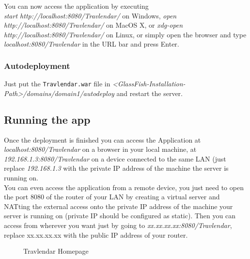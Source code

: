 You can now access the application by executing \\
\textit{start http://localhost:8080/Travlendar/} on Windows, \textit{open http://localhost:8080/Travlendar/} on MacOS X, or \textit{xdg-open http://localhost:8080/Travlendar/} on Linux, or simply open the browser and type \textit{localhost:8080/Travlendar} in the URL bar and press Enter.

\subsubsection{Autodeployment}
Just put the \texttt{Travlendar.war} file in \textit{<GlassFish-Installation-Path>/domains/domain1/autodeploy} and restart the server.

\subsection{Running the app}
Once the deployment is finished you can access the Application at \textit{localhost:8080/Travlendar}
on a browser in your local machine, at \textit{192.168.1.3:8080/Travlendar} on a device connected to the same LAN (just replace \textit{192.168.1.3} with the private IP address of the machine the server is running on. 
\\You can even access the application from a remote device, you just need to open the port 8080 of the router of your LAN by creating a virtual server and NATting the external access onto the private IP address of the machine your server is running on (private IP should be configured as static). Then you can access from wherever you want just by going to \textit{xx.xx.xx.xx:8080/Travlendar}, replace xx.xx.xx.xx with the public IP address of your router.

\begin{figure} 
\begin{center}

\caption{Travlendar Homepage} 
\label{fig:travlendarhomepage} 


\end{center}
\end{figure} 

